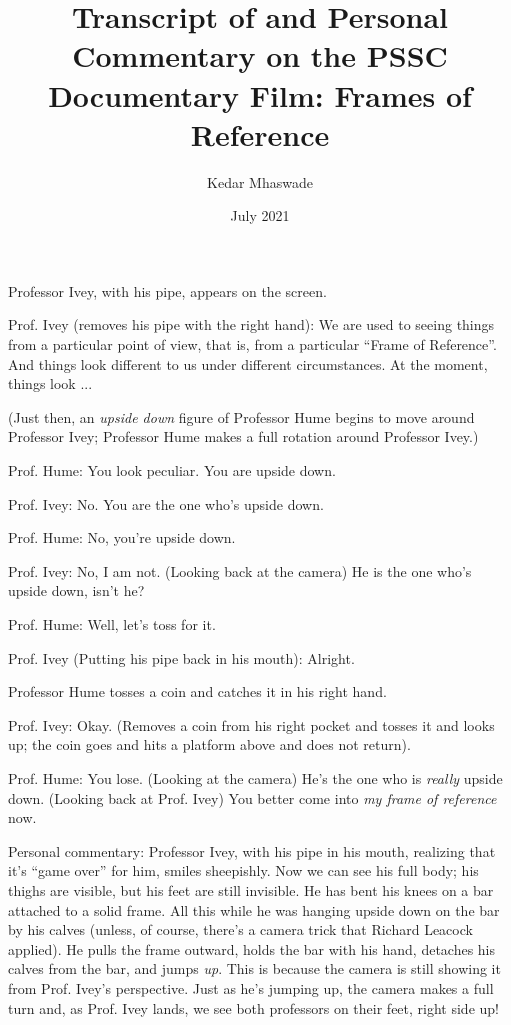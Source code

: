 \documentclass[a6paper]{article}
\newcommand{\perscom}[1]{
    {\footnotesize Personal commentary:  #1}
}
\begin{document}
\title{Transcript of and Personal Commentary on the PSSC Documentary Film: Frames of Reference}
\date{July 2021}
\author{Kedar Mhaswade}
\maketitle

Professor Ivey, with his pipe, appears on the screen.

Prof. Ivey (removes his pipe with the right hand): We are used to seeing things from a particular point of view, that is, from a particular ``Frame of Reference''. And things look different to us under different circumstances. At the moment, things look ...

(Just then, an \emph{upside down} figure of Professor Hume begins to move around Professor Ivey; Professor Hume makes a full rotation around Professor Ivey.)

Prof. Hume: You look peculiar. You are upside down.

Prof. Ivey: No. You are the one who's upside down.

Prof. Hume: No, you're upside down.

Prof. Ivey: No, I am not. (Looking back at the camera) He is the one who's upside down, isn't he?

Prof. Hume: Well, let's toss for it.

Prof. Ivey (Putting his pipe back in his mouth): Alright.

Professor Hume tosses a coin and catches it in his right hand. 

Prof. Ivey: Okay. (Removes a coin from his right pocket and tosses it and looks up; the coin goes and hits a platform above and does not return).

Prof. Hume: You lose. (Looking at the camera) He's the one who is \emph{really} upside down. (Looking back at Prof. Ivey) You better come into \emph{my frame of reference} now.

\perscom{ Professor Ivey, with his pipe in his mouth, realizing that it's ``game over'' for him, smiles sheepishly. Now we can see his full body; his thighs are visible, but his feet are still invisible. He has bent his knees on a bar attached to a solid frame. All this while he was hanging upside down on the bar by his calves (unless, of course, there's a camera trick that Richard Leacock applied). He pulls the frame outward, holds the bar with his hand, detaches his calves from the bar, and jumps \emph{up}. This is because the camera is still showing it from Prof. Ivey's perspective. Just as he's jumping up, the camera makes a full turn and, as Prof. Ivey lands, we see both professors on their feet, right side up! }
\end{document}
